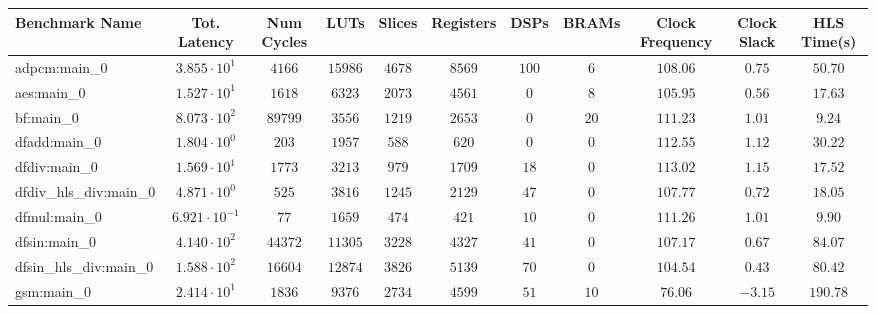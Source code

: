 \begin{tabular}{|l|c|c|c|c|c|c|c|c|c|c|}
\hline
Benchmark Name          & Tot. Latency            & Num Cycles & LUTs      & Slices    & Registers & DSPs    & BRAMs   & Clock Frequency & Clock Slack & HLS Time(s) \\
\hline
adpcm:main\_0           & $ 3.855 \cdot 10^{1}  $ & $ 4166   $ & $ 15986 $ & $ 4678  $ & $ 8569  $ & $ 100 $ & $ 6   $ & $ 108.06      $ & $ 0.75    $ & $ 50.70   $ \\
aes:main\_0             & $ 1.527 \cdot 10^{1}  $ & $ 1618   $ & $ 6323  $ & $ 2073  $ & $ 4561  $ & $ 0   $ & $ 8   $ & $ 105.95      $ & $ 0.56    $ & $ 17.63   $ \\
bf:main\_0              & $ 8.073 \cdot 10^{2}  $ & $ 89799  $ & $ 3556  $ & $ 1219  $ & $ 2653  $ & $ 0   $ & $ 20  $ & $ 111.23      $ & $ 1.01    $ & $ 9.24    $ \\
dfadd:main\_0           & $ 1.804 \cdot 10^{0}  $ & $ 203    $ & $ 1957  $ & $ 588   $ & $ 620   $ & $ 0   $ & $ 0   $ & $ 112.55      $ & $ 1.12    $ & $ 30.22   $ \\
dfdiv:main\_0           & $ 1.569 \cdot 10^{1}  $ & $ 1773   $ & $ 3213  $ & $ 979   $ & $ 1709  $ & $ 18  $ & $ 0   $ & $ 113.02      $ & $ 1.15    $ & $ 17.52   $ \\
dfdiv\_hls\_div:main\_0 & $ 4.871 \cdot 10^{0}  $ & $ 525    $ & $ 3816  $ & $ 1245  $ & $ 2129  $ & $ 47  $ & $ 0   $ & $ 107.77      $ & $ 0.72    $ & $ 18.05   $ \\
dfmul:main\_0           & $ 6.921 \cdot 10^{-1} $ & $ 77     $ & $ 1659  $ & $ 474   $ & $ 421   $ & $ 10  $ & $ 0   $ & $ 111.26      $ & $ 1.01    $ & $ 9.90    $ \\
dfsin:main\_0           & $ 4.140 \cdot 10^{2}  $ & $ 44372  $ & $ 11305 $ & $ 3228  $ & $ 4327  $ & $ 41  $ & $ 0   $ & $ 107.17      $ & $ 0.67    $ & $ 84.07   $ \\
dfsin\_hls\_div:main\_0 & $ 1.588 \cdot 10^{2}  $ & $ 16604  $ & $ 12874 $ & $ 3826  $ & $ 5139  $ & $ 70  $ & $ 0   $ & $ 104.54      $ & $ 0.43    $ & $ 80.42   $ \\
gsm:main\_0             & $ 2.414 \cdot 10^{1}  $ & $ 1836   $ & $ 9376  $ & $ 2734  $ & $ 4599  $ & $ 51  $ & $ 10  $ & $ 76.06       $ & $ -3.15   $ & $ 190.78  $ \\

\end{tabular}
